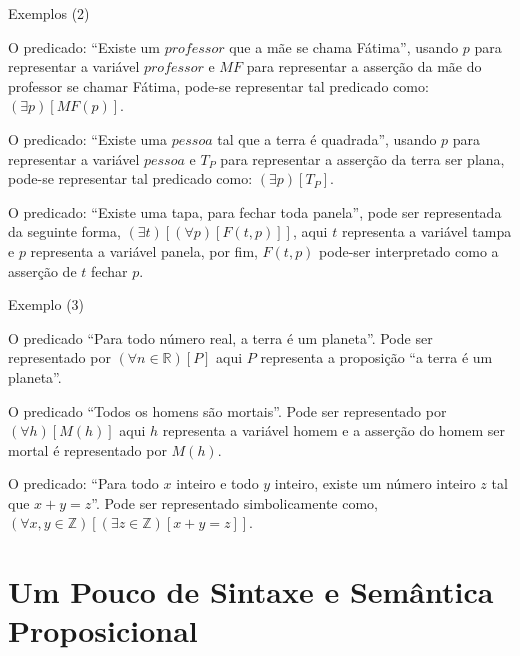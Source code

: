 \documentclass[aspectratio=169]{beamer}
\begin{document}
	\begin{frame}{Exemplos (2)}
		\begin{example}
			O predicado: ``Existe um $professor$ que a mãe se chama Fátima'', usando $p$ para representar a variável $professor$ e $MF$ para representar a asserção da mãe do professor se chamar Fátima, pode-se representar tal predicado como: $(\exists p)[MF(p)]$.
		\end{example}
		
		\begin{example}
			O predicado: ``Existe uma $pessoa$ tal que a terra é quadrada'', usando $p$ para representar a variável $pessoa$ e $T_P$ para representar a asserção da terra ser plana, pode-se representar tal predicado como: $(\exists p)[T_P]$.
		\end{example}
		
		\begin{example}
			O predicado: ``Existe uma tapa, para fechar toda panela'', pode ser representada da seguinte forma, $(\exists t)[(\forall p)[F(t, p)]]$, aqui $t$ representa a variável tampa e $p$ representa a variável panela, por fim, $F(t,p)$ pode-ser interpretado como a asserção de $t$ fechar $p$.
		\end{example}
	\end{frame}

	\begin{frame}{Exemplo (3)}
		\begin{example}
			O predicado ``Para todo número real, a terra é um planeta''. Pode ser representado por $(\forall n \in \mathbb{R})[P]$ aqui $P$ representa a proposição ``a terra é um planeta''.
		\end{example}
		
		\begin{example}
			O predicado ``Todos os homens são mortais''. Pode ser representado por $(\forall h)[M(h)]$ aqui $h$ representa a variável homem e a asserção do homem ser mortal é representado por $M(h)$.
		\end{example}
		
		\begin{example}
			O predicado: ``Para todo $x$ inteiro e todo $y$ inteiro, existe um número inteiro $z$ tal que $x + y = z$''. Pode ser representado simbolicamente como, $(\forall x, y \in \mathbb{Z})[(\exists z \in \mathbb{Z})[x+ y = z]]$.
		\end{example}
	\end{frame}
	
	\section{Um Pouco de Sintaxe e Semântica Proposicional}
	
\end{document}
